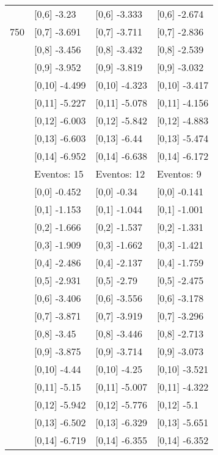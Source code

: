 \begin{table}
\begin{tabular}[t]{llll}
 & {}[0,6] -3.23 & {}[0,6] -3.333 & {}[0,6] -2.674\\
750 & {}[0,7] -3.691 & {}[0,7] -3.711 & {}[0,7] -2.836\\
\addlinespace
 & {}[0,8] -3.456 & {}[0,8] -3.432 & {}[0,8] -2.539\\
 & {}[0,9] -3.952 & {}[0,9] -3.819 & {}[0,9] -3.032\\
 & {}[0,10] -4.499 & {}[0,10] -4.323 & {}[0,10] -3.417\\
 & {}[0,11] -5.227 & {}[0,11] -5.078 & {}[0,11] -4.156\\
 & {}[0,12] -6.003 & {}[0,12] -5.842 & {}[0,12] -4.883\\
\addlinespace
 & {}[0,13] -6.603 & {}[0,13] -6.44 & {}[0,13] -5.474\\
 & {}[0,14] -6.952 & {}[0,14] -6.638 & {}[0,14] -6.172\\
 & Eventos:  15 & Eventos:  12 & Eventos:  9\\
 & {}[0,0] -0.452 & {}[0,0] -0.34 & {}[0,0] -0.141\\
 & {}[0,1] -1.153 & {}[0,1] -1.044 & {}[0,1] -1.001\\
\addlinespace
 & {}[0,2] -1.666 & {}[0,2] -1.537 & {}[0,2] -1.331\\
 & {}[0,3] -1.909 & {}[0,3] -1.662 & {}[0,3] -1.421\\
 & {}[0,4] -2.486 & {}[0,4] -2.137 & {}[0,4] -1.759\\
 & {}[0,5] -2.931 & {}[0,5] -2.79 & {}[0,5] -2.475\\
 & {}[0,6] -3.406 & {}[0,6] -3.556 & {}[0,6] -3.178\\
\addlinespace
1000 & {}[0,7] -3.871 & {}[0,7] -3.919 & {}[0,7] -3.296\\
 & {}[0,8] -3.45 & {}[0,8] -3.446 & {}[0,8] -2.713\\
 & {}[0,9] -3.875 & {}[0,9] -3.714 & {}[0,9] -3.073\\
 & {}[0,10] -4.44 & {}[0,10] -4.25 & {}[0,10] -3.521\\
 & {}[0,11] -5.15 & {}[0,11] -5.007 & {}[0,11] -4.322\\
\addlinespace
 & {}[0,12] -5.942 & {}[0,12] -5.776 & {}[0,12] -5.1\\
 & {}[0,13] -6.502 & {}[0,13] -6.329 & {}[0,13] -5.651\\
 & {}[0,14] -6.719 & {}[0,14] -6.355 & {}[0,14] -6.352\\
\bottomrule
\end{tabular}
\end{table}
